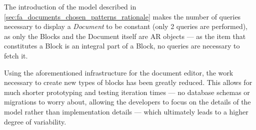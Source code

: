 The introduction of the model described in \ref{sec:fa_documents_chosen_patterns_rationale} makes the number of queries necessary to display a \emph{Document} to be constant (only 2 queries are performed), as only the Blocks and the Document itself are AR objects --- as the item that constitutes a Block is an integral part of a Block, no queries are necessary to fetch it.


Using the aforementioned infrastructure for the document editor, the work necessary to create new types of blocks has been greatly reduced. This allows for much shorter prototyping and testing iteration times --- no database schemas or migrations to worry about, allowing the developers to focus on the details of the model rather than implementation details --- which ultimately leads to a higher degree of variability.

